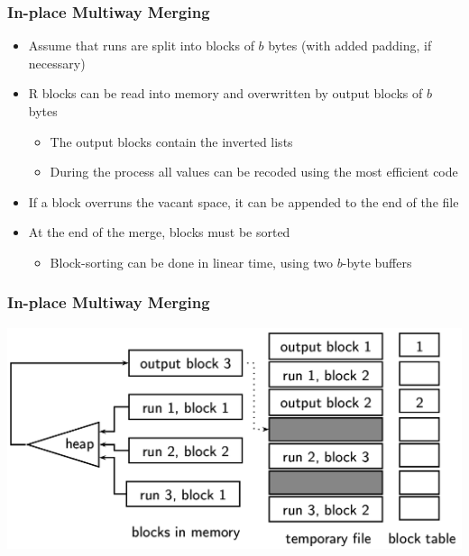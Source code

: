 \documentclass[svgnames]{beamer}
\begin{document}
\begin{frame}
    \frametitle{In-place Multiway Merging}

    \begin{block}{}
        \begin{itemize}
        \item Assume that runs are split into blocks of $b$ bytes (with added
            padding, if necessary)
        \item R blocks can be read into memory and overwritten by output blocks of
            $b$ bytes
            \begin{itemize}
            \item The output blocks contain the inverted lists
            \item During the process all values can be recoded using the most
                efficient code
            \end{itemize}
        \item If a block overruns the vacant space, it can be appended to the end
            of the file
        \item At the end of the merge, blocks must be sorted
            \begin{itemize}
            \item Block-sorting can be done in linear time, using two $b$-byte
                buffers
            \end{itemize}
        \end{itemize}
    \end{block}


\end{frame}


\begin{frame}
    \frametitle{In-place Multiway Merging}

    \includegraphics[width=\linewidth]{in-place}

\end{frame}
\end{document}
